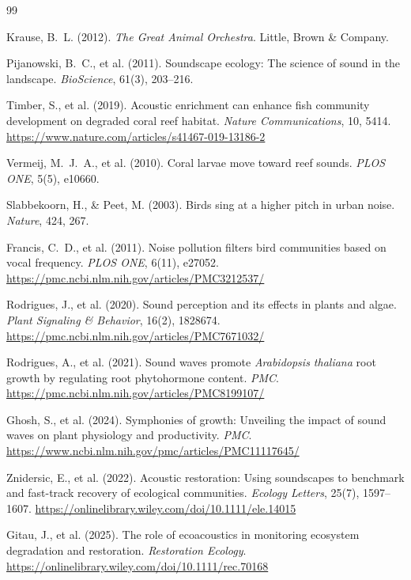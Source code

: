 \documentclass[12pt, a4paper]{article}
\begin{document}
\begin{thebibliography}{99}

Krause, B.~L. (2012). \textit{The Great Animal Orchestra}. Little, Brown \& Company.

Pijanowski, B.~C., et al. (2011).
Soundscape ecology: The science of sound in the landscape.
\textit{BioScience}, 61(3), 203--216.

Timber, S., et al. (2019).
Acoustic enrichment can enhance fish community development on degraded coral reef habitat.
\textit{Nature Communications}, 10, 5414.
\url{https://www.nature.com/articles/s41467-019-13186-2}

Vermeij, M.~J.~A., et al. (2010).
Coral larvae move toward reef sounds.
\textit{PLOS ONE}, 5(5), e10660.

Slabbekoorn, H., \& Peet, M. (2003).
Birds sing at a higher pitch in urban noise.
\textit{Nature}, 424, 267.

Francis, C.~D., et al. (2011).
Noise pollution filters bird communities based on vocal frequency.
\textit{PLOS ONE}, 6(11), e27052.
\url{https://pmc.ncbi.nlm.nih.gov/articles/PMC3212537/}

Rodrigues, J., et al. (2020).
Sound perception and its effects in plants and algae.
\textit{Plant Signaling \& Behavior}, 16(2), 1828674.
\url{https://pmc.ncbi.nlm.nih.gov/articles/PMC7671032/}

Rodrigues, A., et al. (2021).
Sound waves promote \textit{Arabidopsis thaliana} root growth by regulating root phytohormone content.
\textit{PMC}.
\url{https://pmc.ncbi.nlm.nih.gov/articles/PMC8199107/}

Ghosh, S., et al. (2024).
Symphonies of growth: Unveiling the impact of sound waves on plant physiology and productivity.
\textit{PMC}.
\url{https://www.ncbi.nlm.nih.gov/pmc/articles/PMC11117645/}

Znidersic, E., et al. (2022).
Acoustic restoration: Using soundscapes to benchmark and fast-track recovery of ecological communities.
\textit{Ecology Letters}, 25(7), 1597--1607.
\url{https://onlinelibrary.wiley.com/doi/10.1111/ele.14015}

Gitau, J., et al. (2025).
The role of ecoacoustics in monitoring ecosystem degradation and restoration.
\textit{Restoration Ecology}.
\url{https://onlinelibrary.wiley.com/doi/10.1111/rec.70168}


\end{thebibliography}
\end{document}

